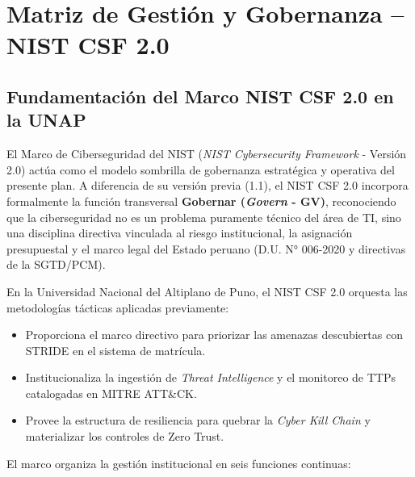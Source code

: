 \chapter{Matriz de Gestión y Gobernanza -- NIST CSF 2.0}
\label{ch:nist_csf}

\section{Fundamentación del Marco NIST CSF 2.0 en la UNAP}

El Marco de Ciberseguridad del NIST (\textit{NIST Cybersecurity Framework} - Versión 2.0) actúa como el modelo sombrilla de gobernanza estratégica y operativa del presente plan. A diferencia de su versión previa (1.1), el NIST CSF 2.0 incorpora formalmente la función transversal \textbf{Gobernar (\textit{Govern} - GV)}, reconociendo que la ciberseguridad no es un problema puramente técnico del área de TI, sino una disciplina directiva vinculada al riesgo institucional, la asignación presupuestal y el marco legal del Estado peruano (D.U. N° 006-2020 y directivas de la SGTD/PCM).

En la Universidad Nacional del Altiplano de Puno, el NIST CSF 2.0 orquesta las metodologías tácticas aplicadas previamente:

\begin{itemize}
    \item Proporciona el marco directivo para priorizar las amenazas descubiertas con STRIDE en el sistema de matrícula.
    \item Institucionaliza la ingestión de \textit{Threat Intelligence} y el monitoreo de TTPs catalogadas en MITRE ATT\&CK.
    \item Provee la estructura de resiliencia para quebrar la \textit{Cyber Kill Chain} y materializar los controles de Zero Trust.
\end{itemize}

El marco organiza la gestión institucional en seis funciones continuas:

\vspace{0.25cm}


